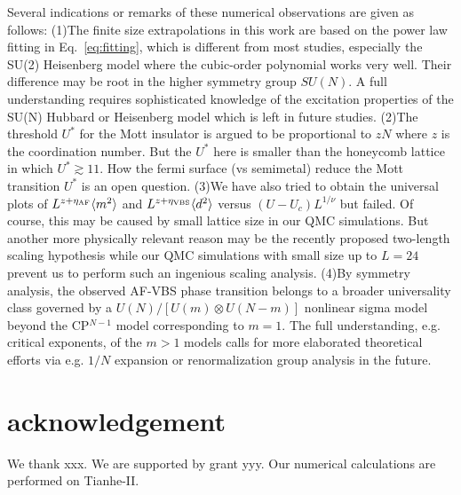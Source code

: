 \documentclass[twocolumn,superscriptaddress,prb]{revtex4-1}
\begin{document}
Several indications or remarks of these numerical observations are given as follows: 
(1)The finite size extrapolations in this work are based on the power law fitting in Eq.~\ref{eq:fitting}, which is different from most studies, especially the SU(2) Heisenberg model where the cubic-order polynomial works very well. \cite{Neuberger_PRB_1989,*Sandvik_PRB_1997} Their difference may be root in the higher symmetry group $SU(N)$. A full understanding requires sophisticated knowledge of the excitation properties of the SU(N) Hubbard or Heisenberg model which is left in future studies. 
(2)The threshold $U^*$ for the Mott insulator is argued to be proportional to $zN$ where $z$ is the coordination number. \cite{Zhou_PRB_2016} But the $U^*$ here is smaller than the honeycomb lattice in which $U^*\gtrsim11$. \cite{Zhou_PRB_2016} How the fermi surface (vs semimetal) reduce the Mott transition $U^*$ is an open question.
(3)We have also tried to obtain the universal plots of $L^{z+\eta_{\rm AF}}\langle m^2 \rangle$ and $L^{z+\eta_{\rm VBS}}\langle d^2 \rangle$ versus $(U-U_c)L^{1/\nu}$ but failed. Of course, this may be caused by small lattice size in our QMC simulations. But another more physically relevant reason may be the recently proposed two-length scaling hypothesis \cite{Shao_S_2016} while our QMC simulations with small size up to $L=24$ prevent us to perform such an ingenious scaling analysis.
(4)By symmetry analysis, the observed AF-VBS phase transition belongs to a broader universality class governed by a $U(N)/[U(m)\otimes U(N-m)]$ nonlinear sigma model beyond the CP$^{N-1}$ model corresponding to $m=1$. The full understanding, e.g. critical exponents, of the $m>1$ models calls for more elaborated theoretical efforts via e.g. $1/N$ expansion \cite{Wang_a_2018} or renormalization group analysis in the future.


\section{acknowledgement}
We thank xxx.
We are supported by grant yyy.
Our numerical calculations are performed on Tianhe-II. 


\end{document}
